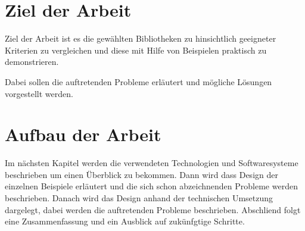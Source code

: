 \section{Ziel der Arbeit}
Ziel der Arbeit ist es die gewählten Bibliotheken zu hinsichtlich geeigneter
Kriterien zu vergleichen und diese mit Hilfe von Beispielen praktisch zu
demonstrieren.

Dabei sollen die auftretenden Probleme erläutert und mögliche Lösungen
vorgestellt werden.

\section{Aufbau der Arbeit}
Im nächsten Kapitel werden die verwendeten Technologien und Softwaresysteme
beschrieben um einen Überblick zu bekommen. Dann wird dass Design der einzelnen
Beispiele erläutert und die sich schon abzeichnenden Probleme werden beschrieben.
Danach wird das Design anhand der technischen Umsetzung dargelegt, dabei werden
die auftretenden Probleme beschrieben. Abschliend folgt eine Zusammenfassung und
ein Ausblick auf zukünfgtige Schritte.

